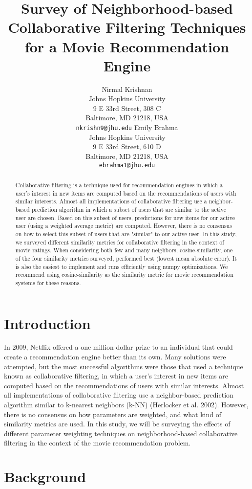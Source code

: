 \documentclass[11pt,letterpaper]{article}
\title{Survey of Neighborhood-based Collaborative Filtering Techniques for a Movie Recommendation Engine}
\author{Nirmal Krishnan\\
  Johns Hopkins University\\
  9 E 33rd Street, 308 C\\
  Baltimore, MD 21218, USA\\
  {\tt nkrishn9@jhu.edu}
  \And
  Emily Brahma \\
  Johns Hopkins University \\
  9 E 33rd Street, 610 D \\
  Baltimore, MD 21218, USA\\
  {\tt ebrahma1@jhu.edu}}
\date{}
\begin{document}
\maketitle
\begin{abstract}
Collaborative filtering is a technique used for recommendation engines in which a user's interest in new items are computed based on the recommendations of users with similar interests. Almost all implementations of collaborative filtering use a neighbor-based prediction algorithm in which a subset of users that are similar to the active user are chosen. Based on this subset of users, predictions for new items for our active user (using a weighted average metric) are computed. However, there is no consensus on how to select this subset of users that are "similar" to our active user. In this study, we surveyed different similarity metrics for collaborative filtering in the context of movie ratings. When considering both few and many neighbors, cosine-similarity, one of the four similarity metrics surveyed, performed best (lowest mean absolute error). It is also the easiest to implement and runs efficiently using numpy optimizations. We recommend using cosine-similarity as the similarity metric for movie recommendation systems for these reasons.
\end{abstract}

\section{Introduction}
In 2009, Netflix offered a one million dollar prize to an individual that could create a recommendation engine better than its own. Many solutions were attempted, but the most successful algorithms were those that used a technique known as collaborative filtering, in which a user’s interest in new items are computed based on the recommendations of users with similar interests. Almost all implementations of collaborative filtering use a neighbor-based prediction algorithm similar to k-nearest neighbors (k-NN) (Herlocker et al. 2002). However, there is no consensus on how parameters are weighted, and what kind of similarity metrics are used. In this study, we will be surveying the effects of different parameter weighting techniques on neighborhood-based collaborative filtering in the context of the movie recommendation problem.


\section{Background}
\end{document}
